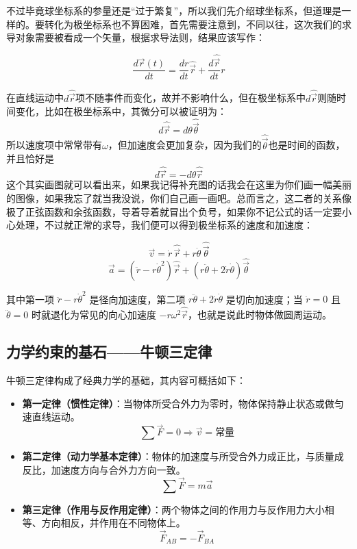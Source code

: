 \documentclass[UTF8]{ctexbook}
\begin{document}
不过毕竟球坐标系的参量还是“过于繁复”，所以我们先介绍球坐标系，但道理是一样的。要转化为极坐标系也不算困难，首先需要注意到，不同以往，这次我们的求导对象需要被看成一个矢量，根据求导法则，结果应该写作：

\[
\frac{d\vec{r}(t)}{dt} = \frac{dr}{dt}\hat{\vec{r}} + \frac{d\hat{\vec{r}}}{dt}r
\]

在直线运动中$d\hat{\vec{r}}$项不随事件而变化，故并不影响什么，但在极坐标系中$d\hat{\vec{r}}$则随时间变化，比如在极坐标系中，其微分可以被证明为：
\[
d\hat{\vec{r}}= d{\theta} \hat{\vec{\theta}}
\]
所以速度项中常常带有$\omega$，但加速度会更加复杂，因为我们的$\hat{\vec{\theta}}$也是时间的函数，并且恰好是
\[
d\hat{\vec{r}}= -d{\theta} \hat{\vec{r}}
\]
这个其实画图就可以看出来，如果我记得补充图的话我会在这里为你们画一幅美丽的图像，如果我忘了就当我没说，你们自己画一画吧。总而言之，这二者的关系像极了正弦函数和余弦函数，导着导着就冒出个负号，如果你不记公式的话一定要小心处理，不过就正常的求导，我们便可以得到极坐标系的速度和加速度：

\[
\vec{v}=\dot r\,\hat{\vec{r}}+r\dot\theta\,\hat{\vec{\theta}}
\]
\[
\vec{a}=\left(\ddot r-r\dot\theta^{2}\right)\hat{\vec{r}}
+\left(r\ddot\theta+2\dot r\dot\theta\right)\hat{\vec{\theta}}
\]

其中第一项 \(\ddot r-r\dot\theta^2\) 是径向加速度，第二项 \(r\ddot\theta+2\dot r\dot\theta\) 是切向加速度；当 \(\dot r=0\) 且 \(\ddot\theta=0\) 时就退化为常见的向心加速度 \(-r\omega^2\hat{\vec{r}}\)，也就是说此时物体做圆周运动。



\subsection{力学约束的基石——牛顿三定律}

牛顿三定律构成了经典力学的基础，其内容可概括如下：

\begin{itemize}
\item \textbf{第一定律（惯性定律）}：当物体所受合外力为零时，物体保持静止状态或做匀速直线运动。
\[
\sum \vec{F}=0 \Rightarrow \vec{v}=\text{常量}
\]

\item \textbf{第二定律（动力学基本定律）}：物体的加速度与所受合外力成正比，与质量成反比，加速度方向与合外力方向一致。
\[
\sum \vec{F}=m\vec{a}
\]

\item \textbf{第三定律（作用与反作用定律）}：两个物体之间的作用力与反作用力大小相等、方向相反，并作用在不同物体上。
\[
\vec{F}_{AB}=-\vec{F}_{BA}
\]
\end{itemize}
\end{document}
